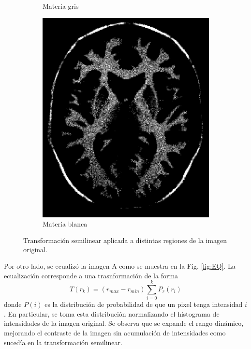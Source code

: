 \documentclass[11pt,twocolumn,twoside]{opticajnl}
\begin{document}
\begin{figure}[h]
\begin{subfigure}[h]{0.24\linewidth}
            \caption{Materia gris} 
         \end{subfigure}
         \begin{subfigure}[h]{0.24\linewidth}
            \centering
            \includegraphics[width=\textwidth]{Figuras/ImageA_113_150.png}
            \caption{Materia blanca} 
         \end{subfigure}
    \caption{Transformación semilinear aplicada a distintas regiones de la imagen original.%
    }
    \label{fig:Semilineartrans_region}
\end{figure}

Por otro lado, se ecualizó la imagen A como se muestra en la Fig. \ref{fig:EQ}. La ecualización corresponde a una trasnformación de la forma
\begin{equation}
    T(r_k) = (r_{max} - r_{min}) \sum_{i=0}^{k} P_r(r_i)
\end{equation}
donde $P(i)$ es la distribución de probabilidad de que un pixel tenga intensidad $i$. En particular, se toma esta distribución normalizando el histograma de intensidades de la imagen original. Se observa que se expande el rango dinámico, mejorando el contraste de la imagen sin acumulación de intensidades como sucedía en la transformación semilinear.
\end{document}
